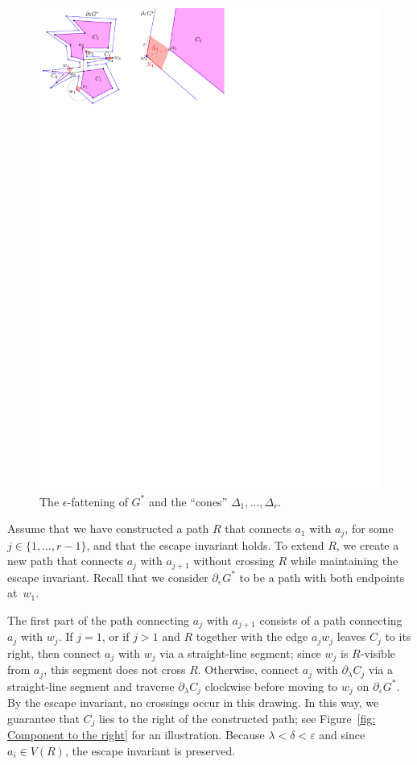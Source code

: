 \documentclass[11pt]{patmorin}
\begin{document}
\begin{figure}[tb]
\centering
\includegraphics{img/Neighborhood.pdf}
\caption{The $\epsilon$-fattening of $G^*$ and the ``cones'' $\Delta_1,\ldots,\Delta_r$.}
\label{fig:Neighborhood}
\end{figure}

Assume that we have constructed a path $R$ that connects $a_1$ with $a_j$, for some $j\in\{1,\ldots,r-1\}$, and that the escape invariant holds.  To extend $R$, we create a new path that connects $a_j$ with $a_{j+1}$ without crossing $R$ while maintaining the escape invariant.  Recall that we consider $\partial_\varepsilon G^*$ to be a path with both endpoints at~$w_1$.

The first part of the path connecting $a_j$ with $a_{j+1}$ consists of a path connecting $a_j$ with $w_j$. If $j=1$, or if $j>1$ and $R$ together with the edge $a_j w_j$ leaves $C_j$ to its right, then connect $a_j$ with $w_j$ via a straight-line segment; since $w_j$ is $R$-visible from $a_j$, this segment does not cross $R$. Otherwise, connect $a_j$ with $\partial_\lambda C_j$ via a straight-line segment and traverse $\partial_\lambda C_j$ clockwise before moving to $w_j$ on $\partial_\varepsilon G^*$.  By the escape invariant, no crossings occur in this drawing.  In this way, we guarantee that $C_j$ lies to the right of the constructed path; see Figure~\ref{fig: Component to the right} for an illustration. Because $\lambda < \delta < \varepsilon$ and since $a_i\in V(R)$, the escape invariant is preserved.
\end{document}
